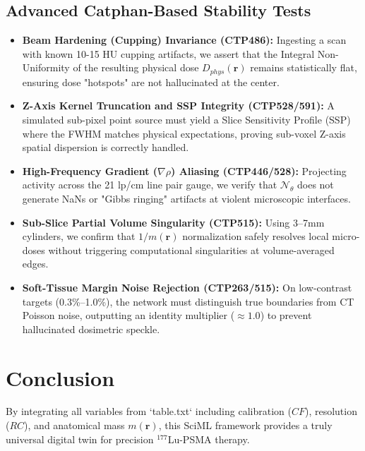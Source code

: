 \documentclass[11pt,a4paper]{article}
\begin{document}
\subsection{Advanced Catphan-Based Stability Tests}
\begin{itemize}
    \item \textbf{Beam Hardening (Cupping) Invariance (CTP486):} Ingesting a scan with known 10-15 HU cupping artifacts, we assert that the Integral Non-Uniformity of the resulting physical dose $D_{phys}(\mathbf{r})$ remains statistically flat, ensuring dose "hotspots" are not hallucinated at the center.
    \item \textbf{Z-Axis Kernel Truncation and SSP Integrity (CTP528/591):} A simulated sub-pixel point source must yield a Slice Sensitivity Profile (SSP) where the FWHM matches physical expectations, proving sub-voxel Z-axis spatial dispersion is correctly handled.
    \item \textbf{High-Frequency Gradient ($\nabla \rho$) Aliasing (CTP446/528):} Projecting activity across the 21 lp/cm line pair gauge, we verify that $\mathcal{N}_\theta$ does not generate NaNs or "Gibbs ringing" artifacts at violent microscopic interfaces.
    \item \textbf{Sub-Slice Partial Volume Singularity (CTP515):} Using 3--7mm cylinders, we confirm that $1/m(\mathbf{r})$ normalization safely resolves local micro-doses without triggering computational singularities at volume-averaged edges.
    \item \textbf{Soft-Tissue Margin Noise Rejection (CTP263/515):} On low-contrast targets (0.3\%--1.0\%), the network must distinguish true boundaries from CT Poisson noise, outputting an identity multiplier ($\approx 1.0$) to prevent hallucinated dosimetric speckle.
\end{itemize}

\section{Conclusion}
By integrating all variables from `table.txt` including calibration ($CF$), resolution ($RC$), and anatomical mass $m(\mathbf{r})$, this SciML framework provides a truly universal digital twin for precision $^{177}$Lu-PSMA therapy.



\end{document}
